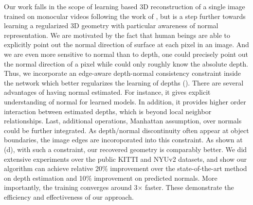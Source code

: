 Our work falls in the scope of learning based 3D reconstruction of a single image trained on monocular videos following the work of \cite{zhou2017unsupervised}, but is a step further towards learning a regularized 3D geometry with particular awareness of normal representation. 
We are motivated by the fact that human beings are able to explicitly point out the normal direction of surface at each pixel in an image. And we are even more sensitive to normal than to depth, \eg one could precisely point out the normal direction of a pixel while could only roughly know the absolute depth. 
Thus, we incorporate an edge-aware depth-normal consistency constraint inside the network which better regularizes the learning of depths (). 
There are several advantages of having normal estimated. For instance, it gives explicit understanding of normal for learned models.  In addition, it provides higher order interaction between estimated depths, which is beyond local neighbor relationships. Last, additional operations, \eg Manhattan assumption, over normals could be further integrated. As depth/normal discontinuity often appear at object boundaries, the image edges are incoroporated into this constraint.
As shown at (d), with such a constraint, our recovered geometry is comparably better. We did extensive experiments over the public KITTI and NYUv2 datasets, and show our algorithm can achieve relative 20$\%$ improvement over the state-of-the-art method on depth estimation and 10$\%$ improvement on predicted normals. More importantly, the training converges around 3$\times$ faster. These demonstrate the efficiency and effectiveness of our approach.




